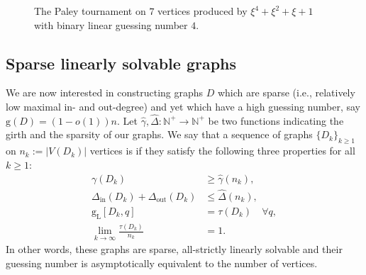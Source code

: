 \documentclass[a4paper, 11pt]{book}
\numberwithin{equation}{section}
\theoremstyle{plain}
\newcommand{\dMax}{\Delta}
\newcommand{\inn}[1]{#1_\mathrm{in}}
\newcommand{\out}[1]{#1_\mathrm{out}}
\newcommand{\dInMax}{\inn{\dMax}}
\newcommand{\dOutMax}{\out{\dMax}}
\newcommand{\feedback}{\tau}
\newcommand{\girth}{\gamma}
\newcommand{\linear}[1]{#1_\mathrm{L}}
\newcommand{\guessing}{\mathrm{g}}
\newcommand{\linearGuessing}{\linear{\guessing}}
\renewcommand{\(}{\ldbrack}
\renewcommand{\)}{\rdbrack}
\newcommand{\BF}[1]{{\bf\boldmath{#1}\unboldmath}}
\newcommand{\N}{\mathbb{N}}
\begin{document}
\begin{figure}
\centering
{}
\caption{The Paley tournament on $7$ vertices produced by $\xi^4 + \xi^2 + \xi + 1$ with binary linear guessing number $4$.}
\label{fig:P7}
\end{figure}






\subsection{Sparse linearly solvable graphs} \label{sec:sparse_linearly_solvable}


We are now interested in constructing graphs $D$ which are sparse (i.e., relatively low maximal in- and out-degree) and yet which have a high guessing number, say $\guessing(D) = (1 - o(1))n$. Let $\hat{\gamma}, \hat{\Delta} : \N^+ \to \N^+$ be two functions indicating the girth and the sparsity of our graphs. We say that a sequence of graphs $\{D_k\}_{k \ge 1}$ on $n_k := |V(D_k)|$ vertices is \BF{$(\hat{\gamma}, \hat{\Delta})$-suitable} if they satisfy the following three properties for all $k \ge 1$:
\begin{align*}
	\girth(D_k) &\ge \hat{\gamma}(n_k),\\
	\dInMax(D_k) + \dOutMax(D_k) &\le \hat{\Delta}(n_k),\\
	\linearGuessing[D_k, q] &= \feedback(D_k) \quad \forall q,\\
	\lim_{k \to \infty} \frac{\feedback(D_k)}{n_k} &= 1.
\end{align*}
In other words, these graphs are sparse, all-strictly linearly solvable and their guessing number is asymptotically equivalent to the number of vertices. 
\end{document}
